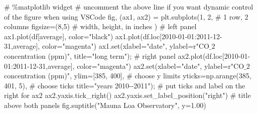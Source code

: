 \documentclass[
  letterpaper,
  DIV=11,
  numbers=noendperiod,
  oneside]{scrreprt}
\newenvironment{Shaded}{\begin{snugshade}}{\end{snugshade}}
\newcommand{\BuiltInTok}[1]{\textcolor[rgb]{0.00,0.23,0.31}{#1}}
\newcommand{\CommentTok}[1]{\textcolor[rgb]{0.37,0.37,0.37}{#1}}
\newcommand{\DecValTok}[1]{\textcolor[rgb]{0.68,0.00,0.00}{#1}}
\newcommand{\FloatTok}[1]{\textcolor[rgb]{0.68,0.00,0.00}{#1}}
\newcommand{\NormalTok}[1]{\textcolor[rgb]{0.00,0.23,0.31}{#1}}
\newcommand{\OperatorTok}[1]{\textcolor[rgb]{0.37,0.37,0.37}{#1}}
\newcommand{\StringTok}[1]{\textcolor[rgb]{0.13,0.47,0.30}{#1}}
\newcommand{\VerbatimStringTok}[1]{\textcolor[rgb]{0.13,0.47,0.30}{#1}}
\begin{document}
\begin{Shaded}
\begin{Highlighting}[]
\CommentTok{\# \%matplotlib widget}
\CommentTok{\# uncomment the above line if you want dynamic control of the figure when using VSCode}
\NormalTok{fig, (ax1, ax2) }\OperatorTok{=}\NormalTok{ plt.subplots(}\DecValTok{1}\NormalTok{, }\DecValTok{2}\NormalTok{,  }\CommentTok{\# 1 row, 2 columns}
\NormalTok{                               figsize}\OperatorTok{=}\NormalTok{(}\DecValTok{8}\NormalTok{,}\DecValTok{5}\NormalTok{)  }\CommentTok{\# width, height, in inches}
\NormalTok{                               )}
\CommentTok{\# left panel}
\NormalTok{ax1.plot(df[}\StringTok{\textquotesingle{}average\textquotesingle{}}\NormalTok{], color}\OperatorTok{=}\StringTok{"black"}\NormalTok{)}
\NormalTok{ax1.plot(df.loc[}\StringTok{\textquotesingle{}2010{-}01{-}01\textquotesingle{}}\NormalTok{:}\StringTok{\textquotesingle{}2011{-}12{-}31\textquotesingle{}}\NormalTok{,}\StringTok{\textquotesingle{}average\textquotesingle{}}\NormalTok{], color}\OperatorTok{=}\StringTok{"magenta"}\NormalTok{)}
\NormalTok{ax1.}\BuiltInTok{set}\NormalTok{(xlabel}\OperatorTok{=}\StringTok{"date"}\NormalTok{,}
\NormalTok{       ylabel}\OperatorTok{=}\VerbatimStringTok{r"CO$\_2$ concentration (ppm)"}\NormalTok{,}
\NormalTok{       title}\OperatorTok{=}\StringTok{"long term"}\NormalTok{)}\OperatorTok{;}
\CommentTok{\# right panel}
\NormalTok{ax2.plot(df.loc[}\StringTok{\textquotesingle{}2010{-}01{-}01\textquotesingle{}}\NormalTok{:}\StringTok{\textquotesingle{}2011{-}12{-}31\textquotesingle{}}\NormalTok{,}\StringTok{\textquotesingle{}average\textquotesingle{}}\NormalTok{], color}\OperatorTok{=}\StringTok{"magenta"}\NormalTok{)}
\NormalTok{ax2.}\BuiltInTok{set}\NormalTok{(xlabel}\OperatorTok{=}\StringTok{"date"}\NormalTok{,}
\NormalTok{        ylabel}\OperatorTok{=}\VerbatimStringTok{r"CO$\_2$ concentration (ppm)"}\NormalTok{,}
\NormalTok{        ylim}\OperatorTok{=}\NormalTok{[}\DecValTok{385}\NormalTok{, }\DecValTok{400}\NormalTok{],  }\CommentTok{\# choose y limits}
\NormalTok{        yticks}\OperatorTok{=}\NormalTok{np.arange(}\DecValTok{385}\NormalTok{, }\DecValTok{401}\NormalTok{, }\DecValTok{5}\NormalTok{),  }\CommentTok{\# choose ticks}
\NormalTok{        title}\OperatorTok{=}\StringTok{"years 2010{-}{-}2011"}\NormalTok{)}\OperatorTok{;}
\CommentTok{\# put ticks and label on the right for ax2}
\NormalTok{ax2.yaxis.tick\_right()}
\NormalTok{ax2.yaxis.set\_label\_position(}\StringTok{"right"}\NormalTok{)}
\CommentTok{\# title above both panels}
\NormalTok{fig.suptitle(}\StringTok{"Mauna Loa Observatory"}\NormalTok{, y}\OperatorTok{=}\FloatTok{1.00}\NormalTok{)}


\end{Highlighting}
\end{Shaded}
\end{document}

